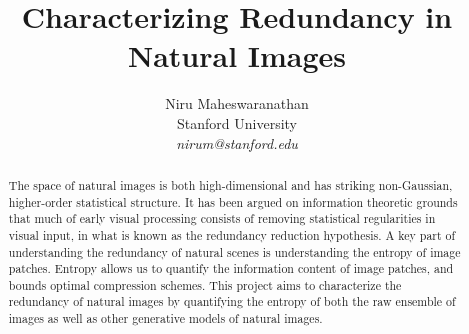 \documentclass[10pt,twocolumn,letterpaper]{article}
\begin{document}
\title{Characterizing Redundancy in Natural Images}

\author{Niru Maheswaranathan\\
Stanford University\\
\textit{nirum@stanford.edu}
}

\maketitle
\thispagestyle{empty}

\begin{abstract}
The space of natural images is both high-dimensional and has striking non-Gaussian, higher-order statistical structure. It has been argued on information theoretic grounds that much of early visual processing consists of removing statistical regularities in visual input, in what is known as the redundancy reduction hypothesis. A key part of understanding the redundancy of natural scenes is understanding the entropy of image patches. Entropy allows us to quantify the information content of image patches, and bounds optimal compression schemes. This project aims to characterize the redundancy of natural images by quantifying the entropy of both the raw ensemble of images as well as other generative models of natural images.
\end{abstract}


\end{document}
